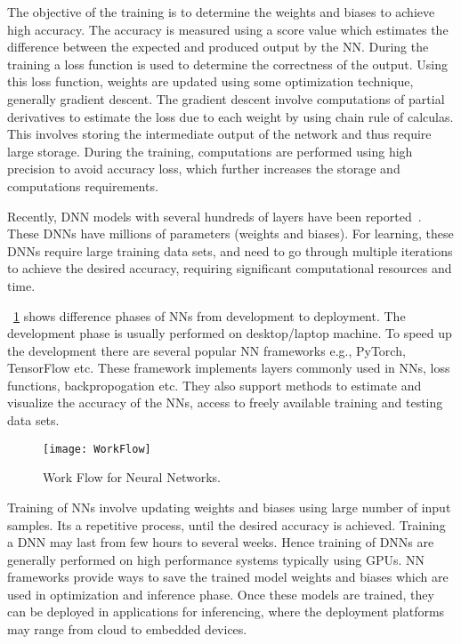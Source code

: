 The objective of the training is to determine the weights and biases to achieve high accuracy. The accuracy is measured using a score value which estimates the difference between the expected and produced output by the NN. During the training a loss function is used to determine the correctness of the output. Using this loss function, weights are updated using some optimization technique, generally gradient descent. The gradient descent involve computations of partial derivatives to estimate the loss due to each weight by using chain rule of calculas. This involves storing the intermediate output of the network and thus require large storage. During the training, computations are performed using high precision to avoid accuracy loss, which further increases the storage and computations requirements.

Recently, DNN models with several hundreds of layers have been reported~\cite{he2016deep}. These DNNs have millions of parameters (weights and biases). For learning, these DNNs require large training data sets, and need to go through multiple iterations to achieve the desired accuracy, requiring significant computational resources and time. 

\figurename{~\ref{fig:workFlow}} shows difference phases of NNs from development to deployment. The development phase is usually performed on desktop/laptop machine. To speed up the development there are several popular NN frameworks e.g., PyTorch, TensorFlow etc. These framework implements layers commonly used in NNs, loss functions, backpropogation etc. They also support  methods to estimate and visualize the accuracy of the NNs, access to freely available training and testing data sets. 
\begin{figure}[!htb]
	\centering
	\captionsetup{font=sf}
	\texttt{[image: WorkFlow]}
	\caption{Work Flow for Neural Networks.}
	\label{fig:workFlow}
\end{figure}

Training of NNs involve updating weights and biases using large number of input samples. Its a repetitive process, until the desired accuracy is achieved. Training a DNN may last from few hours to several weeks. Hence training of DNNs are generally performed on high performance systems typically using GPUs. NN frameworks provide ways to save the trained model weights and biases which are used in optimization and inference phase. Once these models are trained, they can be deployed in applications for inferencing, where the deployment platforms may range from cloud to embedded devices.

